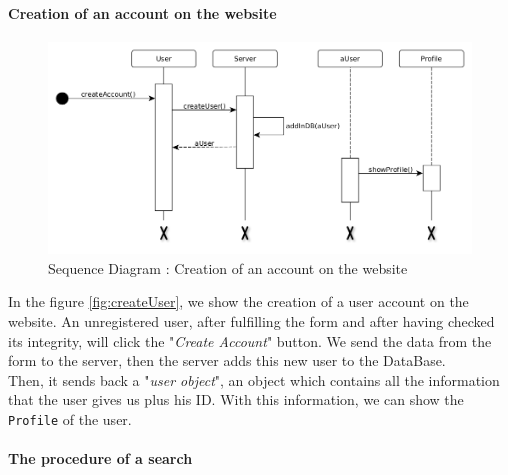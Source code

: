 \paragraph{Creation of an account on the website}

\begin{figure}[H]
	\begin{center}
		\includegraphics[width=.9\textwidth]{seq_createUser.png}
		\caption{Sequence Diagram : Creation of an account on the website}
		\label{fig:createUser}
	\end{center}
\end{figure}

In the figure \vref{fig:createUser}, we show the creation of a user account on the website. An unregistered user, after fulfilling the form and after having checked its integrity, will click the "\textit{Create Account}" button. We send the data from the form to the server, then the server adds this new user to the DataBase.\\
Then, it sends back a "\textit{user object}", an object which contains all the information that the user gives us plus his ID. With this information, we can show the \texttt{Profile} of the user.

\paragraph{The procedure of a search}

